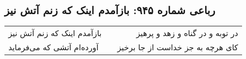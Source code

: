 \begin{center}
\section*{رباعی شماره ۹۴۵: بازآمدم اینک که زنم آتش نیز}
\label{sec:0945}
\begin{longtable}{l p{0.5cm} r}
بازآمدم اینک که زنم آتش نیز
&&
در توبه و در گناه و زهد و پرهیز
\\
آورده‌ام آتشی که می‌فرماید
&&
کای هرچه به جز خداست از جا برخیز
\\
\end{longtable}
\end{center}
